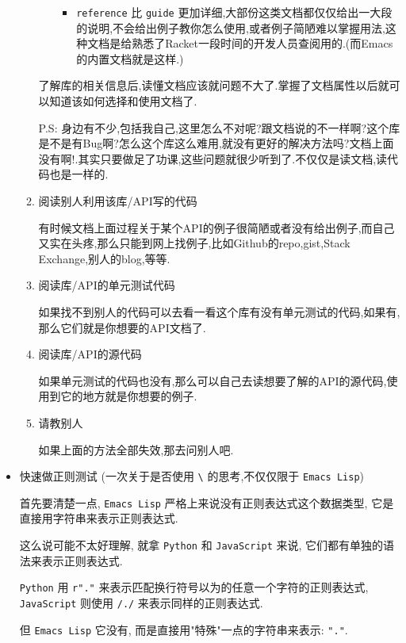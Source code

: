 \documentclass[11pt]{article}
\begin{document}
\begin{itemize}
\begin{enumerate}
\begin{enumerate}
\begin{itemize}
\item \texttt{reference} 比 \texttt{guide} 更加详细,大部份这类文档都仅仅给出一大段的说明,不会给出例子教你怎么使用,或者例子简陋难以掌握用法,这种文档是给熟悉了Racket一段时间的开发人员查阅用的.(而Emacs的内置文档就是这样.)
\end{itemize}
\end{enumerate}

了解库的相关信息后,读懂文档应该就问题不大了.掌握了文档属性以后就可以知道该如何选择和使用文档了.

P.S: 身边有不少,包括我自己,这里怎么不对呢?跟文档说的不一样啊?这个库是不是有Bug啊?怎么这个库这么难用,就没有更好的解决方法吗?文档上面没有啊!.其实只要做足了功课,这些问题就很少听到了.不仅仅是读文档,读代码也是一样的.

\item 阅读别人利用该库/API写的代码

有时候文档上面过程关于某个API的例子很简陋或者没有给出例子,而自己又实在头疼,那么只能到网上找例子,比如Github的repo,gist,Stack Exchange,别人的blog,等等.

\item 阅读库/API的单元测试代码

如果找不到别人的代码可以去看一看这个库有没有单元测试的代码,如果有,那么它们就是你想要的API文档了.

\item 阅读库/API的源代码

如果单元测试的代码也没有,那么可以自己去读想要了解的API的源代码,使用到它的地方就是你想要的例子.

\item 请教别人

如果上面的方法全部失效,那去问别人吧.
\end{enumerate}

\item 快速做正则测试 (一次关于是否使用 \texttt{\textbackslash{}} 的思考,不仅仅限于 \texttt{Emacs Lisp})

首先要清楚一点, \texttt{Emacs Lisp} 严格上来说没有正则表达式这个数据类型, 它是直接用字符串来表示正则表达式.

这么说可能不太好理解, 就拿 \texttt{Python} 和 \texttt{JavaScript} 来说, 它们都有单独的语法来表示正则表达式.

\texttt{Python} 用 \texttt{r"."} 来表示匹配换行符号以为的任意一个字符的正则表达式, \texttt{JavaScript} 则使用 \texttt{/./} 来表示同样的正则表达式.

但 \texttt{Emacs Lisp} 它没有, 而是直接用"特殊"一点的字符串来表示: \texttt{"."}.


\end{itemize}
\end{document}

